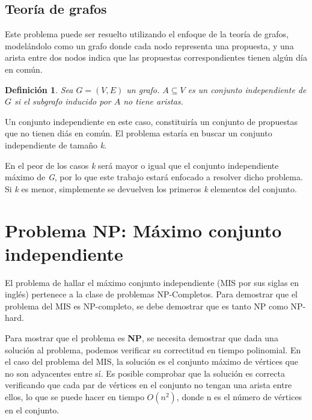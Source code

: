 \documentclass[10pt]{article} %
\newtheorem{mydef}{Definici\'on}%
\begin{document}
	
	\subsection{Teor\'ia de grafos}
	Este problema puede ser resuelto utilizando el enfoque de la teoría de grafos, model\'andolo como un grafo donde cada nodo representa una propuesta, y una arista entre dos nodos indica que las propuestas correspondientes tienen alg\'un d\'ia en com\'un. 
	
	\begin{mydef}
		Sea $G = (V, E)$ un grafo. $A \subseteq V$ es un conjunto independiente de $G$ si el subgrafo inducido por $A$ no tiene aristas.  
	\end{mydef}
	
	Un conjunto independiente en este caso, constituir\'ia un conjunto de propuestas que no tienen di\'as en com\'un. El problema estar\'ia en buscar un conjunto independiente de tama\~no \textit{k}.
	
	En el peor de los casos \textit{k} ser\'a mayor o igual que el conjunto independiente m\'aximo de \textit{G}, por lo que este trabajo estar\'a enfocado a resolver dicho problema. Si \textit{k} es menor, simplemente se devuelven los primeros \textit{k} elementos del conjunto.
	
	\section{Problema NP: M\'aximo conjunto independiente}
	
	El problema de hallar el m\'aximo conjunto independiente (MIS por sus siglas en ingl\'es) pertenece a la clase de problemas NP-Completos. Para demostrar que el problema del MIS es NP-completo, se debe demostrar que es tanto NP como NP-hard.
	
	Para mostrar que el problema es \textbf{NP}, se necesita demostrar que dada una solución al problema, podemos verificar su correctitud en tiempo polinomial. En el caso del problema del MIS, la solución es el conjunto m\'aximo de vértices que no son adyacentes entre sí. Es posible comprobar que la solución es correcta verificando que cada par de vértices en el conjunto no tengan una arista entre ellos, lo que se puede hacer en tiempo $O(n^{2})$, donde n es el n\'umero de v\'ertices en el conjunto.
	
\end{document}
